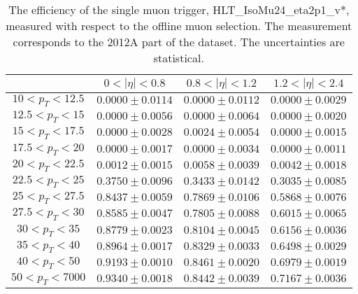 \begin{table}[!ht]
\begin{center}
\begin{tabular}{c|c|c|c}
\hline & $0 < |\eta| < 0.8$ & $0.8 < |\eta| < 1.2$ & $1.2 < |\eta| < 2.4$  \\
\hline
$ 10 < p_T < 12.5$ & $0.0000 \pm 0.0114$ & $0.0000 \pm 0.0112$ & $0.0000 \pm 0.0029$  \\
$12.5 < p_T <  15$ & $0.0000 \pm 0.0056$ & $0.0000 \pm 0.0064$ & $0.0000 \pm 0.0020$  \\
$ 15 < p_T < 17.5$ & $0.0000 \pm 0.0028$ & $0.0024 \pm 0.0054$ & $0.0000 \pm 0.0015$  \\
$17.5 < p_T <  20$ & $0.0000 \pm 0.0017$ & $0.0000 \pm 0.0034$ & $0.0000 \pm 0.0011$  \\
$ 20 < p_T < 22.5$ & $0.0012 \pm 0.0015$ & $0.0058 \pm 0.0039$ & $0.0042 \pm 0.0018$  \\
$22.5 < p_T <  25$ & $0.3750 \pm 0.0096$ & $0.3433 \pm 0.0142$ & $0.3035 \pm 0.0085$  \\
$ 25 < p_T < 27.5$ & $0.8437 \pm 0.0059$ & $0.7869 \pm 0.0106$ & $0.5868 \pm 0.0076$  \\
$27.5 < p_T <  30$ & $0.8585 \pm 0.0047$ & $0.7805 \pm 0.0088$ & $0.6015 \pm 0.0065$  \\
$ 30 < p_T <  35$ & $0.8779 \pm 0.0023$ & $0.8104 \pm 0.0045$ & $0.6156 \pm 0.0036$  \\
$ 35 < p_T <  40$ & $0.8964 \pm 0.0017$ & $0.8329 \pm 0.0033$ & $0.6498 \pm 0.0029$  \\
$ 40 < p_T <  50$ & $0.9193 \pm 0.0010$ & $0.8461 \pm 0.0020$ & $0.6979 \pm 0.0019$  \\
$ 50 < p_T < 7000$ & $0.9340 \pm 0.0018$ & $0.8442 \pm 0.0039$ & $0.7167 \pm 0.0036$  \\
\hline
\end{tabular}
\caption{The efficiency of the single muon trigger,
HLT\_IsoMu24\_eta2p1\_v*,
measured with respect to the offline muon selection. 
The measurement corresponds to the 2012A part of the dataset.
The uncertainties are statistical.}
\label{tab:eff_muon_sgl}
\end{center}
\end{table}



